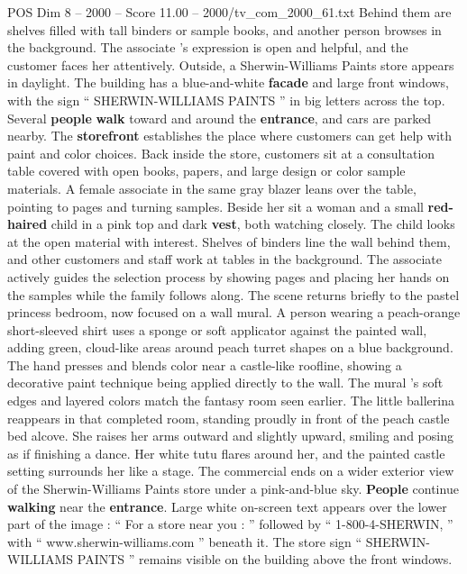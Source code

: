 \begin{textsample}{POS Dim 8 – 2000 – Score 11.00 – 2000/tv\_com\_2000\_61.txt}
Behind them are shelves filled with tall binders or sample books, and another person browses in the background.
The associate ’s expression is open and helpful, and the customer faces her attentively.
Outside, a Sherwin-Williams Paints store appears in daylight.
The building has a blue-and-white \textbf{facade} and large front windows, with the sign “ SHERWIN-WILLIAMS PAINTS ” in big letters across the top.
Several \textbf{people} \textbf{walk} toward and around the \textbf{entrance}, and cars are parked nearby.
The \textbf{storefront} establishes the place where customers can get help with paint and color choices.
Back inside the store, customers sit at a consultation table covered with open books, papers, and large design or color sample materials.
A female associate in the same gray blazer leans over the table, pointing to pages and turning samples.
Beside her sit a woman and a small \textbf{red-haired} child in a pink top and dark \textbf{vest}, both watching closely.
The child looks at the open material with interest.
Shelves of binders line the wall behind them, and other customers and staff work at tables in the background.
The associate actively guides the selection process by showing pages and placing her hands on the samples while the family follows along.
The scene returns briefly to the pastel princess bedroom, now focused on a wall mural.
A person wearing a peach-orange short-sleeved shirt uses a sponge or soft applicator against the painted wall, adding green, cloud-like areas around peach turret shapes on a blue background.
The hand presses and blends color near a castle-like roofline, showing a decorative paint technique being applied directly to the wall.
The mural ’s soft edges and layered colors match the fantasy room seen earlier.
The little ballerina reappears in that completed room, standing proudly in front of the peach castle bed alcove.
She raises her arms outward and slightly upward, smiling and posing as if finishing a dance.
Her white tutu flares around her, and the painted castle setting surrounds her like a stage.
The commercial ends on a wider exterior view of the Sherwin-Williams Paints store under a pink-and-blue sky. \textbf{People} continue \textbf{walking} near the \textbf{entrance}.
Large white on-screen text appears over the lower part of the image : “ For a store near you : ” followed by “ 1-800-4-SHERWIN, ” with “ www.sherwin-williams.com ” beneath it.
The store sign “ SHERWIN-WILLIAMS PAINTS ” remains visible on the building above the front windows.

\end{textsample}
